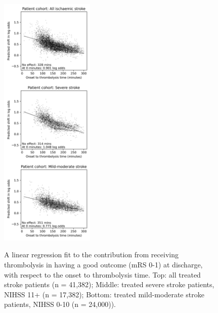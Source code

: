 \begin{figure}[h]
    \centering
    \includegraphics[width=0.40\textwidth]{./images/p3_regression}\\
    \caption{A linear regression fit to the contribution from receiving thrombolysis in having a good outcome (mRS 0-1) at discharge, with respect to the onset to thrombolysis time. Top: all treated stroke patients (n = 41,382); Middle: treated severe stroke patients, NIHSS 11+ (n = 17,382); Bottom: treated mild-moderate stroke patients, NIHSS 0-10 (n = 24,000)).}
    \label{fig:linear_regression_plots}
\end{figure}

